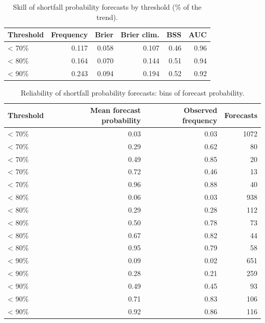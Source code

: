 \begin{table}[H]
\centering
\caption{Skill of shortfall probability forecasts by threshold (\% of the trend).}\label{tab:S_risk}
\small
\begin{tabular}{@{}lrrrrr@{}}
\toprule
Threshold & Frequency & Brier & Brier clim. & BSS & AUC \\
\midrule
< 70\% & 0.117 & 0.058 & 0.107 & 0.46 & 0.96 \\
< 80\% & 0.164 & 0.070 & 0.144 & 0.51 & 0.94 \\
< 90\% & 0.243 & 0.094 & 0.194 & 0.52 & 0.92 \\
\bottomrule
\end{tabular}
\end{table}
\begin{table}[H]
\centering
\caption{Reliability of shortfall probability forecasts: bins of forecast probability.}\label{tab:S_rel}
\small
\begin{tabular}{@{}lrrr@{}}
\toprule
Threshold & Mean forecast probability & Observed frequency & Forecasts \\
\midrule
< 70\% & 0.03 & 0.03 & 1072 \\
< 70\% & 0.29 & 0.62 & 80 \\
< 70\% & 0.49 & 0.85 & 20 \\
< 70\% & 0.72 & 0.46 & 13 \\
< 70\% & 0.96 & 0.88 & 40 \\
< 80\% & 0.06 & 0.03 & 938 \\
< 80\% & 0.29 & 0.28 & 112 \\
< 80\% & 0.50 & 0.78 & 73 \\
< 80\% & 0.67 & 0.82 & 44 \\
< 80\% & 0.95 & 0.79 & 58 \\
< 90\% & 0.09 & 0.02 & 651 \\
< 90\% & 0.28 & 0.21 & 259 \\
< 90\% & 0.49 & 0.45 & 93 \\
< 90\% & 0.71 & 0.83 & 106 \\
< 90\% & 0.92 & 0.86 & 116 \\
\bottomrule
\end{tabular}
\end{table}

